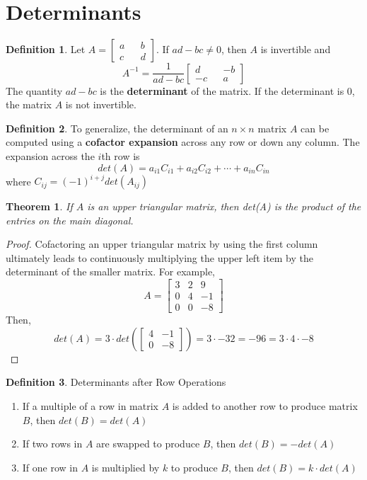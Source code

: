 \documentclass[letterpaper]{article}
\newtheorem{theorem}{Theorem}
\theoremstyle{definition}
\newtheorem{definition}{Definition}[section]
\begin{document}
\section{Determinants}
\begin{definition}
Let $A = \begin{bmatrix}
a && b \\
c && d
\end{bmatrix}$. If $ad - bc \neq 0$, then $A$ is invertible and 
$$A^{-1} = \frac{1}{ad - bc} \begin{bmatrix}
d && -b \\
-c && a
\end{bmatrix}$$
The quantity $ad - bc$ is the \textbf{determinant} of the matrix. If the determinant is 0, the matrix $A$ is not invertible. 
\end{definition}

\begin{definition}
To generalize, the determinant of an $n \times n$ matrix $A$ can be computed using a \textbf{cofactor expansion} across any row or down any column. The expansion across the $i$th row is 
$$det(A) = a_{i1}C_{i1} + a_{i2}C_{i2} + \cdots + a_{in}C_{in}$$ where $C_{ij} = (-1)^{i + j} det(A_{ij})$ 
\end{definition} 

\begin{theorem}
If $A$ is an upper triangular matrix, then det(A) is the product of the entries on the main diagonal. 
\end{theorem}

\begin{proof}
Cofactoring an upper triangular matrix by using the first column ultimately leads to continuously multiplying the upper left item by the determinant of the smaller matrix. For example, 
$$ A = \begin{bmatrix}
3 & 2 & 9 \\
0 & 4 & -1 \\
0 & 0 & -8
\end{bmatrix}$$
Then, 
$$det(A) = 3 \cdot det(\begin{bmatrix}
4 & -1 \\ 
0 & -8
\end{bmatrix}) = 3 \cdot -32 = -96 = 3 \cdot 4 \cdot -8$$
\end{proof}

\begin{definition}
Determinants after Row Operations
\begin{enumerate}
	\item If a multiple of a row in matrix $A$ is added to another row to produce matrix $B$, then $det(B) = det(A)$
	\item If two rows in $A$ are swapped to produce $B$, then $det(B) = -det(A)$
	\item If one row in $A$ is multiplied by $k$ to produce $B$, then $det(B) = k \cdot det(A)$
\end{enumerate}
\end{definition}
\end{document}
